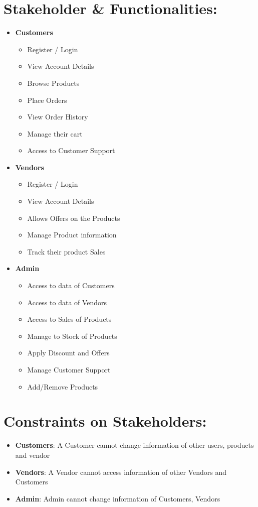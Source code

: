 \documentclass{article}
\begin{document}
\section{Stakeholder \& Functionalities:}
\begin{itemize}
\item \textbf{Customers} 
\begin{itemize}
    \item Register / Login
    \item View Account Details
    \item Browse Products
    \item Place Orders
    \item View Order History
    \item Manage their cart
    \item Access to Customer Support
\end{itemize}
\item \textbf{Vendors}
\begin{itemize}
    \item Register / Login
    \item View Account Details
    \item Allows Offers on the Products
    \item Manage Product information
    \item Track their product Sales
\end{itemize}
\item \textbf{Admin}
\begin{itemize}
    \item Access to data of Customers
    \item Access to data of Vendors
    \item Access to Sales of Products
    \item Manage to Stock of Products
    \item Apply Discount and Offers
    \item Manage Customer Support
    \item Add/Remove Products
\end{itemize}
\end{itemize}
\section{Constraints on Stakeholders:}
\begin{itemize}
    \item \textbf{Customers}: A Customer cannot change information of other users, products and vendor
    \item \textbf{Vendors}: A Vendor cannot access information of other Vendors and Customers
    \item \textbf{Admin}: Admin cannot change information of Customers, Vendors
    \end{itemize}
\end{document}
